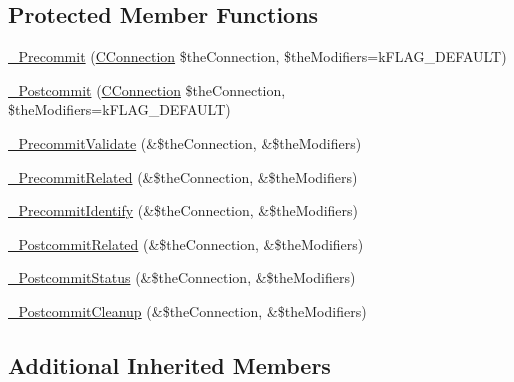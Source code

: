 \subsection*{Protected Member Functions}
\begin{DoxyCompactItemize}
\item 
\hyperlink{class_c_persistent_document_a23cfbb5ebf75e008622ab9e723472c70}{\-\_\-\-Precommit} (\hyperlink{class_c_connection}{C\-Connection} \$the\-Connection, \$the\-Modifiers=k\-F\-L\-A\-G\-\_\-\-D\-E\-F\-A\-U\-L\-T)
\item 
\hyperlink{class_c_persistent_document_aa7fdfe47ee3099ebda49a76e1fa24670}{\-\_\-\-Postcommit} (\hyperlink{class_c_connection}{C\-Connection} \$the\-Connection, \$the\-Modifiers=k\-F\-L\-A\-G\-\_\-\-D\-E\-F\-A\-U\-L\-T)
\item 
\hyperlink{class_c_persistent_document_afdf23fd212084711a4c6357e335c3214}{\-\_\-\-Precommit\-Validate} (\&\$the\-Connection, \&\$the\-Modifiers)
\item 
\hyperlink{class_c_persistent_document_a432319392179e142ed03919b9eddc30e}{\-\_\-\-Precommit\-Related} (\&\$the\-Connection, \&\$the\-Modifiers)
\item 
\hyperlink{class_c_persistent_document_aff5680d29ebcbc9fce715270759a95cd}{\-\_\-\-Precommit\-Identify} (\&\$the\-Connection, \&\$the\-Modifiers)
\item 
\hyperlink{class_c_persistent_document_a7772771f349b5d9d4dbc192ce7c8a012}{\-\_\-\-Postcommit\-Related} (\&\$the\-Connection, \&\$the\-Modifiers)
\item 
\hyperlink{class_c_persistent_document_a774c94863383129a0813ee15a4cb76dd}{\-\_\-\-Postcommit\-Status} (\&\$the\-Connection, \&\$the\-Modifiers)
\item 
\hyperlink{class_c_persistent_document_a649e5b01c3e3c2d9ab0d99cff6b3349f}{\-\_\-\-Postcommit\-Cleanup} (\&\$the\-Connection, \&\$the\-Modifiers)
\end{DoxyCompactItemize}
\subsection*{Additional Inherited Members}


